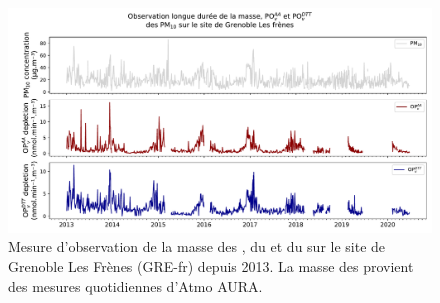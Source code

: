 \begin{figure}[ht]
    \centering
    \includegraphics[width=1.0\linewidth]{figures/chapter04/frenes.pdf}
    \caption{Mesure d'observation de la masse des \PMdix, du \POAA{} et du \PODTT{} sur le
    site de Grenoble Les Frènes (GRE-fr) depuis 2013. La masse des \PMdix{} provient des
mesures quotidiennes d'Atmo AURA.}%
\label{fig:TSGREfr}
\end{figure}

